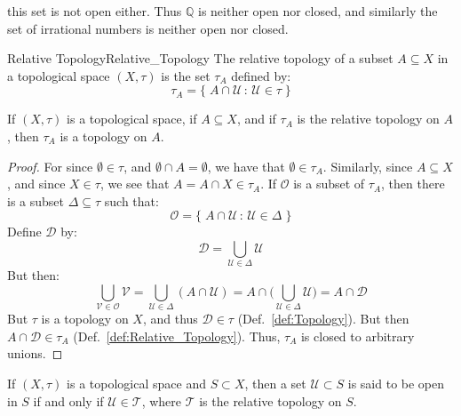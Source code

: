     this set is not open either. Thus $\mathbb{Q}$ is neither open nor closed,
    and similarly the set of irrational numbers is neither open nor closed.
    \begin{ldefinition}{Relative Topology}{Relative_Topology}
        The relative topology of a subset $A\subseteq{X}$ in a topological space
        $(X,\tau)$ is the set $\tau_{A}$ defined by:
        \begin{equation}
            \tau_{A}=\big\{\;A\cap\mathcal{U}\,:\,\mathcal{U}\in\tau\;\big\}
        \end{equation}
    \end{ldefinition}
    \begin{theorem}
        If $(X,\tau)$ is a topological space, if $A\subseteq{X}$, and if
        $\tau_{A}$ is the relative topology on $A$, then $\tau_{A}$ is a
        topology on $A$.
    \end{theorem}
    \begin{proof}
        For since $\emptyset\in\tau$, and $\emptyset\cap{A}=\emptyset$, we have
        that $\emptyset\in\tau_{A}$. Similarly, since $A\subseteq{X}$, and
        since $X\in\tau$, we see that $A=A\cap{X}\in\tau_{A}$. If $\mathcal{O}$
        is a subset of $\tau_{A}$, then there is a subset $\Delta\subseteq\tau$
        such that:
        \begin{equation}
            \mathcal{O}=\big\{\;A\cap\mathcal{U}\,:\,\mathcal{U}\in\Delta\;\}
        \end{equation}
        Define $\mathcal{D}$ by:
        \begin{equation}
            \mathcal{D}=\bigcup_{\mathcal{U}\in\Delta}\mathcal{U}
        \end{equation}
        But then:
        \begin{equation}
            \bigcup_{\mathcal{V}\in\mathcal{O}}\mathcal{V}
            =\bigcup_{\mathcal{U}\in\Delta}(A\cap\mathcal{U})
            =A\cap\Big(\bigcup_{\mathcal{U}\in\Delta}\mathcal{U}\Big)
            =A\cap\mathcal{D}
        \end{equation}
        But $\tau$ is a topology on $X$, and thus $\mathcal{D}\in\tau$
        (Def.~\ref{def:Topology}). But then $A\cap\mathcal{D}\in\tau_{A}$
        (Def.~\ref{def:Relative_Topology}). Thus, $\tau_{A}$
        is closed to arbitrary unions.
    \end{proof}
    \begin{definition}
        If $(X,\tau)$ is a topological space and $S\subset{X}$, then a set
        $\mathcal{U}\subset S$ is said to be open in $S$ if and only if
        $\mathcal{U}\in \mathscr{T}$, where $\mathscr{T}$ is the relative
        topology on $S$.
    \end{definition}
